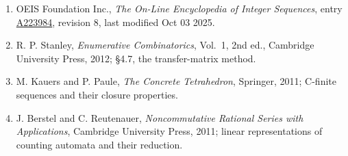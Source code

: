 \documentclass[11pt]{article}
\theoremstyle{definition}
\begin{document}
\begin{enumerate}

\item OEIS Foundation Inc., \emph{The On-Line Encyclopedia of Integer Sequences}, entry \href{https://oeis.org/A223984}{A223984}, revision 8, last modified Oct 03 2025.

\item R. P. Stanley, \emph{Enumerative Combinatorics}, Vol.~1, 2nd ed., Cambridge University Press, 2012; \S4.7, the transfer-matrix method.

\item M. Kauers and P. Paule, \emph{The Concrete Tetrahedron}, Springer, 2011; C-finite sequences and their closure properties.

\item J. Berstel and C. Reutenauer, \emph{Noncommutative Rational Series with Applications}, Cambridge University Press, 2011; linear representations of counting automata and their reduction.

\end{enumerate}
\end{document}
